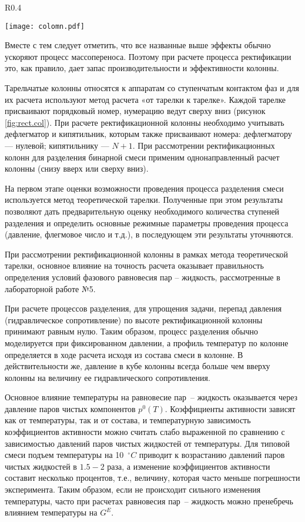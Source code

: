\begin{wrapfigure}{R}{0.4\textwidth}
	\begin{center}
 		\texttt{[image: colomn.pdf]}
	\end{center}
	\caption{Схема ректификационной колонны} \label{fig:rect.col}
\end{wrapfigure}
 
Вместе с тем следует отметить, что все названные выше эффекты обычно ускоряют процесс массопереноса. Поэтому при расчете процесса ректификации это, как правило, дает запас производительности и эффективности колонны.

Тарельчатые колонны относятся к аппаратам со ступенчатым контактом фаз и для их расчета используют метод расчета «от тарелки к тарелке». Каждой тарелке присваивают порядковый номер, нумерацию ведут сверху вниз (рисунок \ref{fig:rect.col}). При расчете ректификационной колонны необходимо учитывать дефлегматор и кипятильник, которым также присваивают номера: дефлегматору --- нулевой; кипятильнику --- $N + 1$. При рассмотрении ректификационных колонн для разделения бинарной смеси применим однонаправленный расчет колонны (снизу вверх или сверху вниз).

На первом этапе оценки возможности проведения процесса разделения смеси используется метод теоретической тарелки. Полученные при этом результаты позволяют дать предварительную оценку необходимого количества ступеней разделения и определить основные режимные параметры проведения процесса (давление, флегмовое число и т.д.), в последующем эти результаты уточняются. 

При рассмотрении ректификационной колонны в рамках метода теоретической тарелки, основное влияние на точность расчета оказывает правильность определения условий фазового равновесия пар – жидкость, рассмотренные в лабораторной работе №5.

При расчете процессов разделения, для упрощения задачи, перепад давления (гидравлическое сопротивление) по высоте ректификационной колонны принимают равным нулю. Таким образом, процесс разделения обычно моделируется при фиксированном давлении, а профиль температур по колонне определяется в ходе расчета исходя из состава смеси в колонне. В действительности же, давление в кубе колонны всегда больше чем вверху колонны на величину ее гидравлического сопротивления. 

Основное влияние температуры на равновесие пар~-- жидкость оказывается через давление паров чистых компонентов $p^0(T)$. Коэффициенты активности зависят как от температуры, так и от состава, и температурную зависимость коэффициентов активности можно считать слабо выраженной по сравнению с зависимостью давлений паров чистых жидкостей от температуры. Для типовой смеси подъем температуры на 10~$\mathrm{^\circ}C$ приводит к возрастанию давлений паров чистых жидкостей в $1.5 - 2$ раза, а изменение коэффициентов активности составит несколько процентов, т.е., величину, которая часто меньше погрешности эксперимента. Таким образом, если не происходит сильного изменения температуры, часто при расчетах равновесия пар~-- жидкость можно пренебречь влиянием температуры на $G^E$.
 
